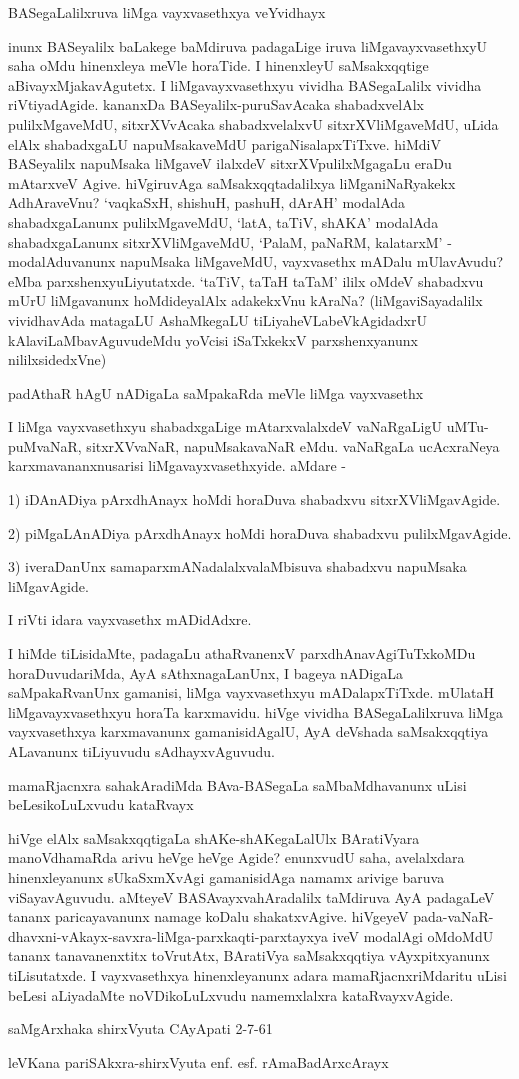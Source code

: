 BASegaLalilxruva liMga vayxvasethxya veYvidhayx

inunx BASeyalilx baLakege baMdiruva padagaLige iruva liMgavayxvasethxyU saha oMdu hinenxleya meVle horaTide. I hinenxleyU saMsakxqqtige aBivayxMjakavAgutetx. I liMgavayxvasethxyu vividha BASegaLalilx vividha riVtiyadAgide. kananxDa BASeyalilx-puruSavAcaka shabadxvelAlx pulilxMgaveMdU, sitxrXVvAcaka shabadxvelalxvU sitxrXVliMgaveMdU, uLida elAlx shabadxgaLU napuMsakaveMdU parigaNisalapxTiTxve. hiMdiV BASeyalilx napuMsaka liMgaveV ilalxdeV sitxrXVpulilxMgagaLu eraDu mAtarxveV Agive. hiVgiruvAga saMsakxqqtadalilxya liMganiNaRyakekx AdhAraveVnu? `vaqkaSxH, shishuH, pashuH, dArAH' modalAda shabadxgaLanunx pulilxMgaveMdU, `latA, taTiV, shAKA' modalAda shabadxgaLanunx sitxrXVliMgaveMdU, `PalaM, paNaRM, kalatarxM' - modalAduvanunx napuMsaka liMgaveMdU, vayxvasethx mADalu mUlavAvudu? eMba parxshenxyuLiyutatxde. `taTiV, taTaH taTaM' ililx oMdeV shabadxvu mUrU liMgavanunx hoMdideyalAlx adakekxVnu kAraNa? (liMgaviSayadalilx vividhavAda matagaLU AshaMkegaLU tiLiyaheVLabeVkAgidadxrU kAlaviLaMbavAguvudeMdu yoVcisi iSaTxkekxV parxshenxyanunx nililxsidedxVne)

padAthaR hAgU nADigaLa saMpakaRda meVle liMga vayxvasethx

I liMga vayxvasethxyu shabadxgaLige mAtarxvalalxdeV vaNaRgaLigU uMTu-puMvaNaR, sitxrXVvaNaR, napuMsakavaNaR eMdu. vaNaRgaLa ucAcxraNeya karxmavananxnusarisi liMgavayxvasethxyide. aMdare -

1) iDAnADiya pArxdhAnayx hoMdi horaDuva shabadxvu sitxrXVliMgavAgide.

2) piMgaLAnADiya pArxdhAnayx hoMdi horaDuva shabadxvu pulilxMgavAgide.

3) iveraDanUnx samaparxmANadalalxvalaMbisuva shabadxvu napuMsaka liMgavAgide.

I riVti idara vayxvasethx mADidAdxre.

I hiMde tiLisidaMte, padagaLu athaRvanenxV parxdhAnavAgiTuTxkoMDu horaDuvudariMda, AyA sAthxnagaLanUnx, I bageya nADigaLa saMpakaRvanUnx gamanisi, liMga vayxvasethxyu mADalapxTiTxde. mUlataH liMgavayxvasethxyu horaTa karxmavidu. hiVge vividha BASegaLalilxruva liMga vayxvasethxya karxmavanunx gamanisidAgalU, AyA deVshada saMsakxqqtiya ALavanunx tiLiyuvudu sAdhayxvAguvudu.

mamaRjacnxra sahakAradiMda BAva-BASegaLa saMbaMdhavanunx uLisi beLesikoLuLxvudu kataRvayx

hiVge elAlx saMsakxqqtigaLa shAKe-shAKegaLalUlx BAratiVyara manoVdhamaRda arivu heVge heVge Agide? enunxvudU saha, avelalxdara hinenxleyanunx sUkaSxmXvAgi gamanisidAga namamx arivige baruva viSayavAguvudu. aMteyeV BASAvayxvahAradalilx taMdiruva AyA padagaLeV tananx paricayavanunx namage koDalu shakatxvAgive. hiVgeyeV pada-vaNaR-dhavxni-vAkayx-savxra-liMga-parxkaqti-parxtayxya iveV modalAgi oMdoMdU tananx tanavanenxtitx toVrutAtx, BAratiVya saMsakxqqtiya vAyxpitxyanunx tiLisutatxde. I vayxvasethxya hinenxleyanunx adara mamaRjacnxriMdaritu uLisi beLesi aLiyadaMte noVDikoLuLxvudu namemxlalxra kataRvayxvAgide.

saMgArxhaka shirxVyuta CAyApati 2-7-61

leVKana pariSAkxra-shirxVyuta enf. esf. rAmaBadArxcArayx
